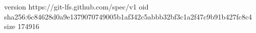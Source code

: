 version https://git-lfs.github.com/spec/v1
oid sha256:6c84628d0a9e1379070749005b1af342c5abbb32bf3c1a2f47c9b91b427fc8c4
size 174916
